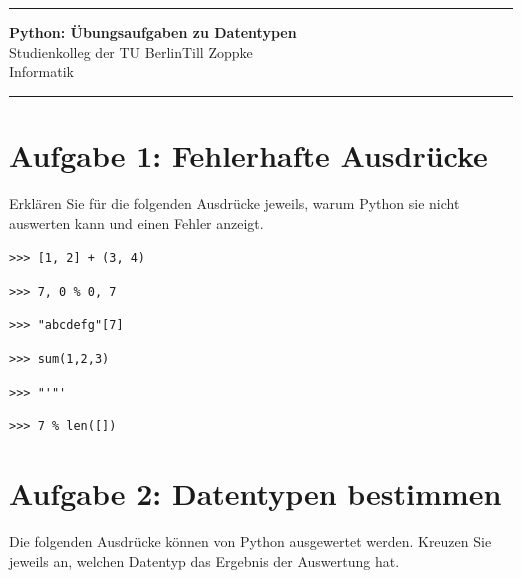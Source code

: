 \documentclass[ngerman,11pt]{article}
\date{\DTMgermanmonthname{\month} \the\year}
\begin{document}
\hrule
\begin{center}
{\large\bf Python: Übungsaufgaben zu Datentypen}\\[-0mm]
Studienkolleg der TU Berlin\hfill Till Zoppke\\
\makeatletter Informatik \hfill \@date\\[2mm] \makeatother
\end{center}
\hrule

\section*{Aufgabe 1: Fehlerhafte Ausdrücke}
Erklären Sie für die folgenden Ausdrücke jeweils, warum Python sie nicht auswerten kann und einen Fehler anzeigt.

\lstinline[style=inline]{>>> [1, 2] + (3, 4)}

\vspace{0.7cm}

\lstinline[style=inline]{>>> 7, 0 % 0, 7}

\vspace{0.7cm}

\lstinline[style=inline]{>>> "abcdefg"[7]}

\vspace{0.7cm}

\lstinline[style=inline]{>>> sum(1,2,3)}

\vspace{0.7cm}

\lstinline[style=inline]{>>> "'"'}

\vspace{0.7cm}

\lstinline[style=inline]{>>> 7 % len([])}

\vspace{0.7cm}

\section*{Aufgabe 2: Datentypen bestimmen}
Die folgenden Ausdrücke können von Python ausgewertet werden. Kreuzen Sie jeweils an, welchen Datentyp das Ergebnis der Auswertung hat.
\end{document}
